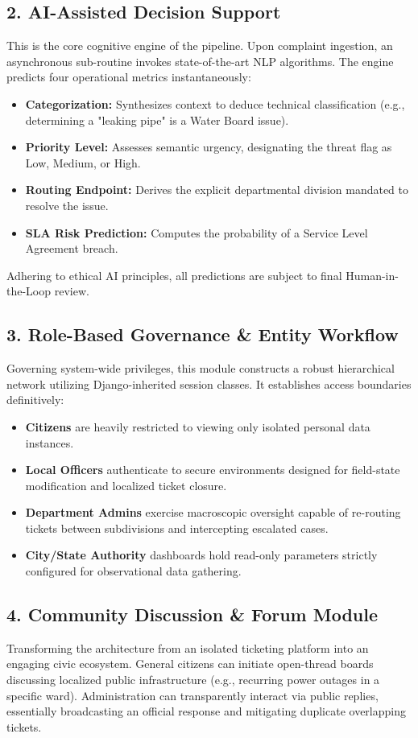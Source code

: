 \documentclass[12pt,a4paper]{report}
\begin{document}
\subsection{2. AI-Assisted Decision Support}
This is the core cognitive engine of the pipeline. Upon complaint ingestion, an asynchronous sub-routine invokes state-of-the-art NLP algorithms. The engine predicts four operational metrics instantaneously:
\begin{itemize}
    \item \textbf{Categorization:} Synthesizes context to deduce technical classification (e.g., determining a "leaking pipe" is a Water Board issue).
    \item \textbf{Priority Level:} Assesses semantic urgency, designating the threat flag as Low, Medium, or High.
    \item \textbf{Routing Endpoint:} Derives the explicit departmental division mandated to resolve the issue.
    \item \textbf{SLA Risk Prediction:} Computes the probability of a Service Level Agreement breach.
\end{itemize}
Adhering to ethical AI principles, all predictions are subject to final Human-in-the-Loop review.

\subsection{3. Role-Based Governance \& Entity Workflow}
Governing system-wide privileges, this module constructs a robust hierarchical network utilizing Django-inherited session classes. It establishes access boundaries definitively:
\begin{itemize}
    \item \textbf{Citizens} are heavily restricted to viewing only isolated personal data instances.
    \item \textbf{Local Officers} authenticate to secure environments designed for field-state modification and localized ticket closure.
    \item \textbf{Department Admins} exercise macroscopic oversight capable of re-routing tickets between subdivisions and intercepting escalated cases.
    \item \textbf{City/State Authority} dashboards hold read-only parameters strictly configured for observational data gathering.
\end{itemize}

\subsection{4. Community Discussion \& Forum Module}
Transforming the architecture from an isolated ticketing platform into an engaging civic ecosystem. General citizens can initiate open-thread boards discussing localized public infrastructure (e.g., recurring power outages in a specific ward). Administration can transparently interact via public replies, essentially broadcasting an official response and mitigating duplicate overlapping tickets.
\end{document}
